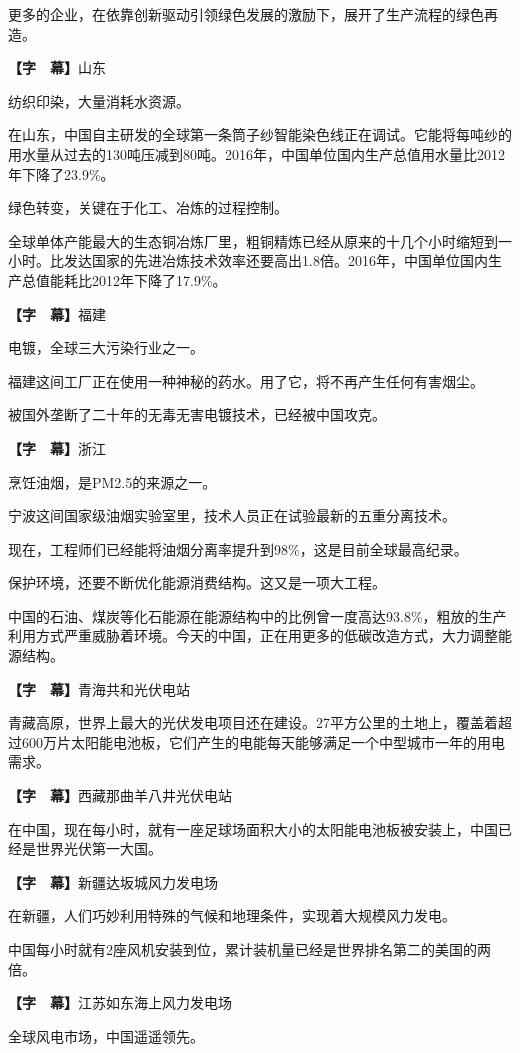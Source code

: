 \documentclass{ctexart}
\newcommand{\zkh}[1]{\textbf{\hspace{-2.7em} 【#1】}}
\begin{document}
 更多的企业，在依靠创新驱动引领绿色发展的激励下，展开了生产流程的绿色再造。

 \zkh{字　幕}山东

 纺织印染，大量消耗水资源。

在山东，中国自主研发的全球第一条筒子纱智能染色线正在调试。它能将每吨纱的用水量从过去的130吨压减到80吨。2016年，中国单位国内生产总值用水量比2012年下降了23.9{\%}。

 绿色转变，关键在于化工、冶炼的过程控制。

全球单体产能最大的生态铜冶炼厂里，粗铜精炼已经从原来的十几个小时缩短到一小时。比发达国家的先进冶炼技术效率还要高出1.8倍。2016年，中国单位国内生产总值能耗比2012年下降了17.9{\%}。

 \zkh{字　幕}福建

 电镀，全球三大污染行业之一。

 福建这间工厂正在使用一种神秘的药水。用了它，将不再产生任何有害烟尘。

 被国外垄断了二十年的无毒无害电镀技术，已经被中国攻克。

 \zkh{字　幕}浙江

 烹饪油烟，是PM2.5的来源之一。

 宁波这间国家级油烟实验室里，技术人员正在试验最新的五重分离技术。

 现在，工程师们已经能将油烟分离率提升到98{\%}，这是目前全球最高纪录。

 保护环境，还要不断优化能源消费结构。这又是一项大工程。

中国的石油、煤炭等化石能源在能源结构中的比例曾一度高达93.8{\%}，粗放的生产利用方式严重威胁着环境。今天的中国，正在用更多的低碳改造方式，大力调整能源结构。

 \zkh{字　幕}青海共和光伏电站

 
青藏高原，世界上最大的光伏发电项目还在建设。27平方公里的土地上，覆盖着超过600万片太阳能电池板，它们产生的电能每天能够满足一个中型城市一年的用电需求。

 \zkh{字　幕}西藏那曲羊八井光伏电站

 
在中国，现在每小时，就有一座足球场面积大小的太阳能电池板被安装上，中国已经是世界光伏第一大国。

 \zkh{字　幕}新疆达坂城风力发电场

 在新疆，人们巧妙利用特殊的气候和地理条件，实现着大规模风力发电。

 中国每小时就有2座风机安装到位，累计装机量已经是世界排名第二的美国的两倍。

 \zkh{字　幕}江苏如东海上风力发电场

 全球风电市场，中国遥遥领先。
\end{document}

